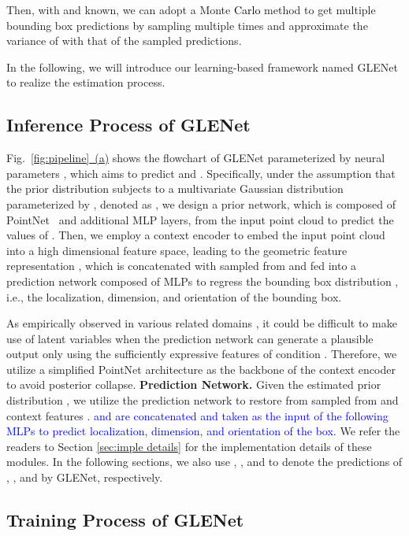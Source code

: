 \documentclass[twocolumn]{svjour3}
\newcommand{\revise}[1]{\textcolor{black}{#1}}
\begin{document}
Then, with  and  known, we can adopt a Monte \revise{Carlo} method to get multiple bounding box predictions by sampling  multiple times and approximate the variance of  with that of the sampled predictions. 

In the following, we will introduce our learning-based framework named GLENet to realize the estimation process. 

\subsection{Inference Process of GLENet}
Fig.~\hyperref[fig:pipeline]{\ref{fig:pipeline}~(a)} shows the flowchart of GLENet parameterized by neural parameters , which aims to predict  and . 
Specifically, under the assumption that the prior distribution  subjects to a multivariate Gaussian distribution parameterized by , denoted as , we design a prior network, which is composed of PointNet~\citep{qi2017pointnet} and additional MLP layers, from the input point cloud  to predict the values of . 
Then, we employ a context encoder to embed the input point cloud  into a high dimensional feature space, leading to the geometric feature representation , which is concatenated with  sampled from  and fed into a prediction network composed of MLPs to regress the bounding box distribution , i.e., the localization, dimension, and orientation of the bounding box.   

As empirically observed in various related domains \citep{goyal2017z}, it could be difficult to make use of latent variables when the prediction network can generate a plausible output only using the sufficiently expressive features of condition . Therefore, we utilize a simplified PointNet architecture as the backbone of the context encoder to avoid posterior collapse. 
\noindent\textbf{Prediction Network.}
Given the estimated prior distribution , we utilize the prediction network to restore  from  sampled from  and context features . 
\textcolor{blue}{ and  are concatenated and taken as the input of the following MLPs to predict localization, dimension, and orientation of the box.}
\fi 
We refer the readers to Section \ref{sec:imple details} for the implementation details of these modules. In the following sections, we also use , , and  to denote the predictions of , , and  by GLENet, respectively.



\subsection{Training Process of GLENet}
\end{document}
